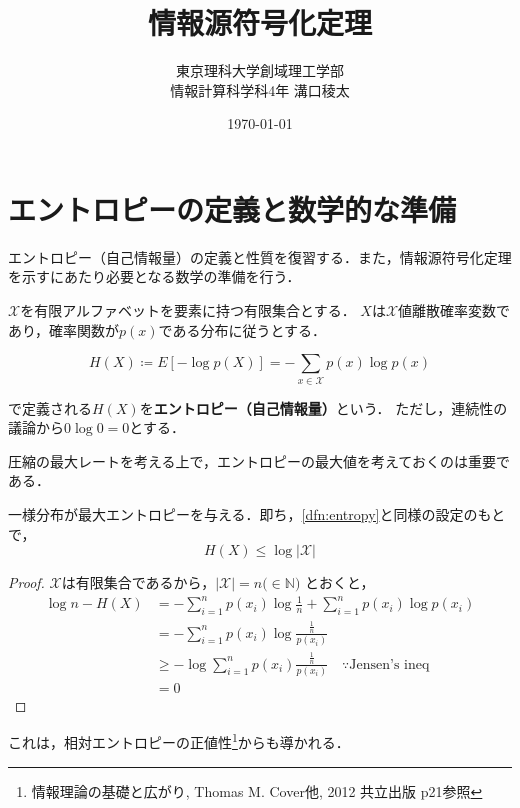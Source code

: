 \documentclass{classes/myclass}
\title{情報源符号化定理}
\author{東京理科大学創域理工学部 \\ 情報計算科学科4年 溝口稜太}
\date{\today}
\begin{document}
\maketitle

\section{エントロピーの定義と数学的な準備}

エントロピー（自己情報量）の定義と性質を復習する．また，情報源符号化定理を示すにあたり必要となる数学の準備を行う．

\begin{dfn}\label{dfn:entropy}
$\mathcal{X}$を有限アルファベットを要素に持つ有限集合とする．
$X$は$\mathcal{X}$値離散確率変数であり，確率関数が$p(x)$である分布に従うとする．

\[
  H(X) \coloneq E[-\log p(X)] = -\sum_{x \in \mathcal{X}}p(x) \log p(x)
\]

で定義される$H(X)$を\textbf{エントロピー（自己情報量）}という．
ただし，連続性の議論から$0 \log 0 = 0$とする．
\end{dfn}


圧縮の最大レートを考える上で，エントロピーの最大値を考えておくのは重要である．

\begin{thm}[エントロピーの最大値]
一様分布が最大エントロピーを与える．即ち，\ref{dfn:entropy}と同様の設定のもとで，
\[
  H(X) \leq \log |\mathcal{X}|
\]
\end{thm}

\begin{proof}
  $\mathcal{X}$は有限集合であるから，$|\mathcal{X}| = n \lparen \in \mathbb{N} \rparen$ とおくと，
\begin{align*}
  \log n - H(X) &= -\sum_{i = 1}^{n} p(x_i) \log \frac{1}{n} + \sum_{i = 1}^{n} p(x_i) \log p(x_i) \\
  &= -\sum_{i = 1}^n p(x_i) \log \frac{\frac{1}{n}}{p(x_i)} \\
  &\geq - \log \sum_{i = 1}^n p(x_i) \frac{\frac{1}{n}}{p(x_i)} \quad \because \text{Jensen's ineq}\\
  &= 0
\end{align*}
\end{proof}

これは，相対エントロピーの正値性\footnote{情報理論の基礎と広がり, Thomas M. Cover他, 2012 共立出版 p21参照  }からも導かれる．
\end{document}

